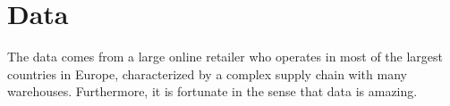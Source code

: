 \documentclass[../../main.tex]{subfiles}
\begin{document}

\chapter{Data}

The data comes from a large online retailer who operates in most of the largest countries in Europe, characterized by a complex supply chain with many warehouses. Furthermore, it is fortunate in the sense that data is amazing.

\end{document}
